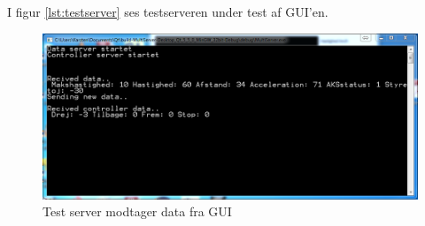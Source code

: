 I figur \ref{lst:testserver} ses testserveren under test af GUI'en. 
\begin{figure}[H]
\centering
\includegraphics[width=\textwidth* 3/4,height=\textwidth* 8/20 ]{../fig/billeder/testserver.png}
\caption{Test server modtager data fra GUI}
\label{fig:testserver}
\end{figure}

\clearpage

